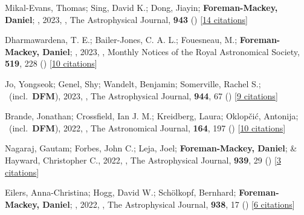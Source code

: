 \item[{\color{numcolor}\scriptsize92}] Mikal-Evans, Thomas; Sing, David K.; Dong, Jiayin; \textbf{Foreman-Mackey, Daniel}; \etal, 2023, , The Astrophysical Journal, \textbf{943} () [\href{https://ui.adsabs.harvard.edu/abs/2023ApJ...943L..17M}{14 citations}]

\item[{\color{numcolor}\scriptsize91}] Dharmawardena, T. E.; Bailer-Jones, C. A. L.; Fouesneau, M.; \textbf{Foreman-Mackey, Daniel}; \etal, 2023, , Monthly Notices of the Royal Astronomical Society, \textbf{519}, 228 () [\href{https://ui.adsabs.harvard.edu/abs/2023MNRAS.519..228D}{10 citations}]

\item[{\color{numcolor}\scriptsize90}] Jo, Yongseok; Genel, Shy; Wandelt, Benjamin; Somerville, Rachel S.; \etal\ (incl.\ \textbf{DFM}), 2023, , The Astrophysical Journal, \textbf{944}, 67 () [\href{https://ui.adsabs.harvard.edu/abs/2023ApJ...944...67J}{9 citations}]

\item[{\color{numcolor}\scriptsize89}] Brande, Jonathan; Crossfield, Ian J. M.; Kreidberg, Laura; Oklop{\v{c}}i{\'c}, Antonija; \etal\ (incl.\ \textbf{DFM}), 2022, , The Astronomical Journal, \textbf{164}, 197 () [\href{https://ui.adsabs.harvard.edu/abs/2022AJ....164..197B}{10 citations}]

\item[{\color{numcolor}\scriptsize88}] Nagaraj, Gautam; Forbes, John C.; Leja, Joel; \textbf{Foreman-Mackey, Daniel}; \& Hayward, Christopher C., 2022, , The Astrophysical Journal, \textbf{939}, 29 () [\href{https://ui.adsabs.harvard.edu/abs/2022ApJ...939...29N}{3 citations}]

\item[{\color{numcolor}\scriptsize87}] Eilers, Anna-Christina; Hogg, David W.; Sch{\"o}lkopf, Bernhard; \textbf{Foreman-Mackey, Daniel}; \etal, 2022, , The Astrophysical Journal, \textbf{938}, 17 () [\href{https://ui.adsabs.harvard.edu/abs/2022ApJ...938...17E}{6 citations}]

